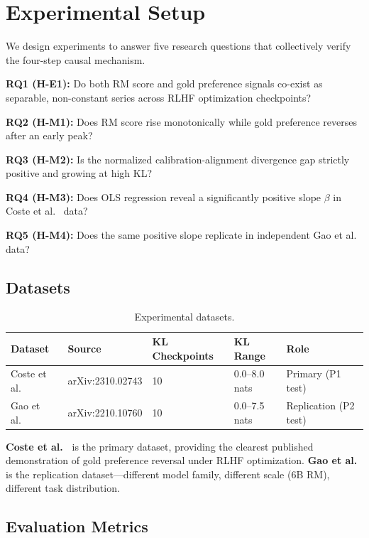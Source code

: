 \section{Experimental Setup}
\label{sec:experiments}

We design experiments to answer five research questions that collectively verify the four-step causal mechanism.

\textbf{RQ1 (H-E1):} Do both RM score and gold preference signals co-exist as separable, non-constant series across RLHF optimization checkpoints?

\textbf{RQ2 (H-M1):} Does RM score rise monotonically while gold preference reverses after an early peak?

\textbf{RQ3 (H-M2):} Is the normalized calibration-alignment divergence gap strictly positive and growing at high KL?

\textbf{RQ4 (H-M3):} Does OLS regression reveal a significantly positive slope $\beta$ in Coste et al.~\cite{Coste2023Reward} data?

\textbf{RQ5 (H-M4):} Does the same positive slope replicate in independent Gao et al.~\cite{Gao2023Scaling} data?

\subsection{Datasets}

\begin{table}[h]
\centering
\caption{Experimental datasets.}
\label{tab:datasets}
\begin{tabular}{lllll}
\toprule
Dataset & Source & KL Checkpoints & KL Range & Role \\
\midrule
Coste et al.~\cite{Coste2023Reward} & arXiv:2310.02743 & 10 & 0.0--8.0 nats & Primary (P1 test) \\
Gao et al.~\cite{Gao2023Scaling} & arXiv:2210.10760 & 10 & 0.0--7.5 nats & Replication (P2 test) \\
\bottomrule
\end{tabular}
\end{table}

\textbf{Coste et al.~\cite{Coste2023Reward}} is the primary dataset, providing the clearest published demonstration of gold preference reversal under RLHF optimization. \textbf{Gao et al.~\cite{Gao2023Scaling}} is the replication dataset---different model family, different scale (6B RM), different task distribution.

\subsection{Evaluation Metrics}

